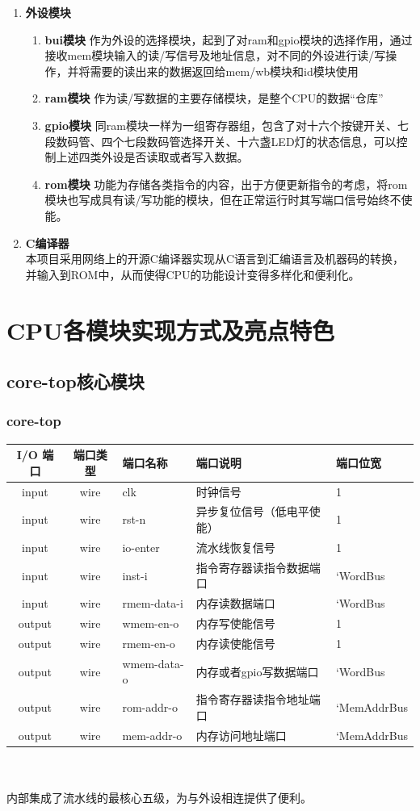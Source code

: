 \documentclass[lang=cn,11pt,a4paper]{elegantpaper}
\begin{document}
\begin{enumerate}
		\item \textbf{外设模块 }
		\begin{enumerate}
			\item \textbf{bui模块}
			作为外设的选择模块，起到了对ram和gpio模块的选择作用，通过接收mem模块输入的读/写信号及地址信息，对不同的外设进行读/写操作，并将需要的读出来的数据返回给mem/wb模块和id模块使用
			\item \textbf{ram模块} 
			作为读/写数据的主要存储模块，是整个CPU的数据“仓库”
			\item \textbf{gpio模块} 同ram模块一样为一组寄存器组，包含了对十六个按键开关、七段数码管、四个七段数码管选择开关、十六盏LED灯的状态信息，可以控制上述四类外设是否读取或者写入数据。
			\item \textbf{rom模块} 
			功能为存储各类指令的内容，出于方便更新指令的考虑，将rom模块也写成具有读/写功能的模块，但在正常运行时其写端口信号始终不使能。
		\end{enumerate}
			\item\textbf{ C编译器 }\\
			本项目采用网络上的开源C编译器实现从C语言到汇编语言及机器码的转换，并输入到ROM中，从而使得CPU的功能设计变得多样化和便利化。
	\end{enumerate}
\section{CPU各模块实现方式及亮点特色}
\subsection{core-top核心模块}
\subsubsection{core-top}
\begin{tabular}{cclll}
	\toprule
	I/O 端口 & 端口类型 &端口名称&端口说明 &端口位宽\\
	\midrule
	input &wire& clk & 时钟信号 & 1 \\
	input &wire& rst-n & 异步复位信号（低电平使能） & 1 \\
	input &wire& io-enter & 流水线恢复信号       & 1   \\
	
	input &wire& inst-i & 指令寄存器读指令数据端口 & `WordBus \\
	input &wire& rmem-data-i & 内存读数据端口 & `WordBus  \\
	
	output &wire& wmem-en-o & 内存写使能信号    & 1   \\
	output &wire& rmem-en-o & 内存读使能信号    & 1  \\
	output &wire& wmem-data-o & 内存或者gpio写数据端口    & `WordBus  \\
	output &wire& rom-addr-o &  指令寄存器读指令地址端口   & `MemAddrBus  \\
	output &wire& mem-addr-o &   内存访问地址端口  & `MemAddrBus  \\
	\bottomrule
\end{tabular}\\
\\
内部集成了流水线的最核心五级，为与外设相连提供了便利。
\end{document}
